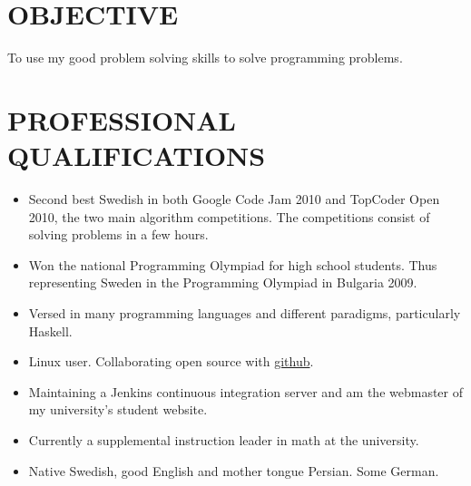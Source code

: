 \documentclass[11pt]{res} %
\begin{document}
 
 

\address{{\bf ADDRESS} \\ Arash Rouhani
                       \\ 464:22 Omg{\aa}ngen
                       \\ 412 80 Gothenburg, Sweden}
\address{{\bf CONTACT} \\ Arash.Rouhani@gmail.com
                       \\+4676 2323 775
                       \\ 1990-11-17 }
 
                                             
\begin{resume}
                                               
 
\section{OBJECTIVE}
To use my good problem solving skills to solve programming problems.

\section{PROFESSIONAL QUALIFICATIONS} 
   \begin{itemize} %
   \item Second best Swedish in both
    Google Code Jam 2010 and TopCoder Open 2010,
    the two main algorithm competitions.
    The competitions consist of solving problems in a few hours.
   \item Won the national Programming Olympiad for high school students.
    Thus representing Sweden in the Programming Olympiad in Bulgaria 2009.
   \item Versed in many programming languages ​​and different paradigms,
    particularly Haskell.
   \item Linux user. Collaborating open source with \hyperref[https://github.com/Tarrasch]{github}.
   \item Maintaining a Jenkins continuous integration server 
    and am the webmaster of my university's student website.
   \item Currently a supplemental instruction leader in math at the university.
   \item Native Swedish, good English and mother tongue Persian. Some German.
 \end{itemize}
 

\end{resume}
\end{document}
